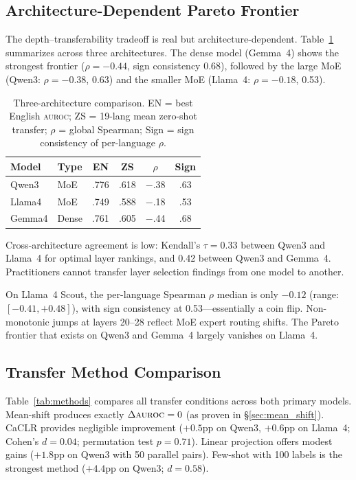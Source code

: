 \documentclass[11pt,a4paper]{article}
\newcommand{\auroc}{\textsc{auroc}}
\begin{document}
\subsection{Architecture-Dependent Pareto Frontier}
\label{sec:pareto}

The depth--transferability tradeoff is real but architecture-dependent. Table~\ref{tab:arch_compare} summarizes across three architectures. The dense model (Gemma~4) shows the strongest frontier ($\rho = -0.44$, sign consistency 0.68), followed by the large MoE (Qwen3: $\rho = -0.38$, 0.63) and the smaller MoE (Llama~4: $\rho = -0.18$, 0.53).

\begin{table}[t]
\centering
\small
\begin{tabular}{@{}llcccc@{}}
\toprule
\textbf{Model} & \textbf{Type} & \textbf{EN} & \textbf{ZS} & \textbf{$\rho$} & \textbf{Sign} \\
\midrule
Qwen3 & MoE & .776 & .618 & $-$.38 & .63 \\
Llama4 & MoE & .749 & .588 & $-$.18 & .53 \\
Gemma4 & Dense & .761 & .605 & $-$.44 & .68 \\
\bottomrule
\end{tabular}
\caption{Three-architecture comparison. EN = best English \auroc{}; ZS = 19-lang mean zero-shot transfer; $\rho$ = global Spearman; Sign = sign consistency of per-language $\rho$.}
\label{tab:arch_compare}
\end{table}

Cross-architecture agreement is low: Kendall's $\tau = 0.33$ between Qwen3 and Llama~4 for optimal layer rankings, and 0.42 between Qwen3 and Gemma~4. Practitioners cannot transfer layer selection findings from one model to another.

On Llama~4 Scout, the per-language Spearman $\rho$ median is only $-0.12$ (range: $[-0.41, +0.48]$), with sign consistency at 0.53---essentially a coin flip. Non-monotonic jumps at layers 20--28 reflect MoE expert routing shifts. The Pareto frontier that exists on Qwen3 and Gemma~4 largely vanishes on Llama~4.

\subsection{Transfer Method Comparison}
\label{sec:methods}

Table~\ref{tab:methods} compares all transfer conditions across both primary models. Mean-shift produces exactly $\Delta\auroc{} = 0$ (as proven in \S\ref{sec:mean_shift}). CaCLR provides negligible improvement ($+0.5$pp on Qwen3, $+0.6$pp on Llama~4; Cohen's $d = 0.04$; permutation test $p = 0.71$). Linear projection offers modest gains ($+1.8$pp on Qwen3 with 50 parallel pairs). Few-shot with 100 labels is the strongest method ($+4.4$pp on Qwen3; $d = 0.58$).
\end{document}
